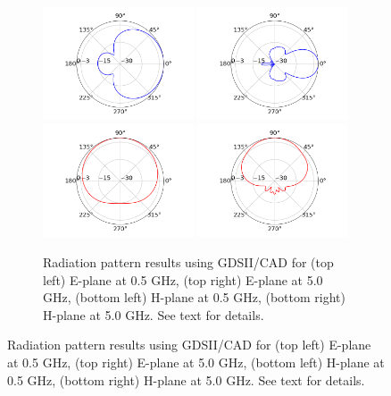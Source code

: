 \documentclass[../../main.tex]{subfiles}
\begin{document}
\begin{figure}
\centering
\begin{subfigure}{0.65\textwidth}
    \includegraphics[width=0.49\textwidth]{figures/3DHorn_CAD_0_5GHz_E_plane.png}
	\includegraphics[width=0.49\textwidth]{figures/3DHorn_CAD_5GHz_E_plane.png} \\
	\includegraphics[width=0.49\textwidth]{figures/3DHorn_CAD_0_5GHz_H_plane.png}
	\includegraphics[width=0.49\textwidth]{figures/3DHorn_CAD_5GHz_H_plane.png}
    \caption{Radiation pattern results using GDSII/CAD for (top left) E-plane at 0.5 GHz, (top right) E-plane at 5.0 GHz, (bottom left) H-plane at 0.5 GHz, (bottom right) H-plane at 5.0 GHz.  See text for details.}

\end{subfigure}
\end{figure}
\end{document}
